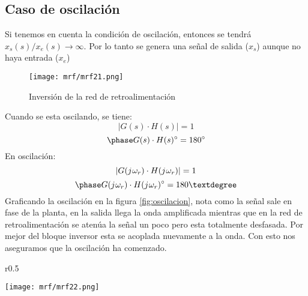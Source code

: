 \documentclass[
	12pt, %
	fleqn, %
	a4paper, %
	oneside, %
]{LegrandOrangeBook}
\begin{document}
\subsection*{Caso de oscilación}
Si tenemos en cuenta la condición de oscilación, entonces se tendrá $x_s(s)/x_e(s)\rightarrow\infty$. Por lo tanto se genera una señal de salida ($x_s$) aunque no haya entrada ($x_e$)
\begin{figure}[H]
\centering
\texttt{[image: mrf/mrf21.png]}
\caption{Inversión de la red de retroalimentación}
\end{figure}
Cuando se esta oscilando, se tiene:
\begin{displaymath}
|G(s)\cdot H(s)|=1
\end{displaymath}
\begin{displaymath}
\fase{ }{G(s)\cdot H(s)}=180^{\circ}
\end{displaymath}
En oscilación:
\begin{displaymath}
|G({j\mkern1mu}\omega_r)\cdot H({j\mkern1mu}\omega_r)|=1
\end{displaymath}
\begin{displaymath}
\fase{ }{G(\iu\omega_r)\cdot H(\iu\omega_r)}=180°
\end{displaymath}
Graficando la oscilación en la figura \ref{fig:oscilacion}, nota como la señal sale en fase de la planta, en la salida llega la onda amplificada mientras que en la red de retroalimentación se atenúa  la señal un poco pero esta totalmente desfasada. Por mejor del bloque inversor esta se acoplada nuevamente a la onda. Con esto nos aseguramos que la oscilación ha comenzado.
\begin{wrapfigure}{r}{0.5\linewidth}%
  \begin{center}
    \texttt{[image: mrf/mrf22.png]}%
  \end{center}
  \caption{Condición de oscilación.}
  \label{fig:oscilacion}
\end{wrapfigure}
\end{document}
